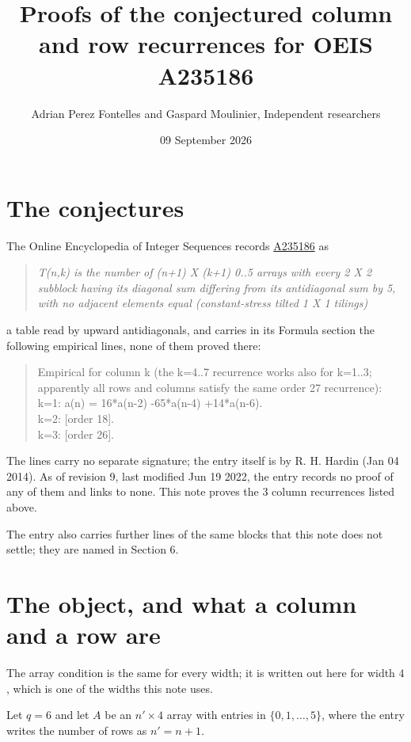 \documentclass[11pt]{article}
\title{Proofs of the conjectured column and row recurrences for OEIS A235186}
\author{Adrian Perez Fontelles and Gaspard Moulinier, Independent researchers}
\date{09 September 2026}
\theoremstyle{definition}
\begin{document}
\maketitle
\section{The conjectures}

The Online Encyclopedia of Integer Sequences records \href{https://oeis.org/A235186}{A235186} as

\begin{quote}\itshape T(n,k) is the number of (n+1) X (k+1) 0..5 arrays with every 2 X 2 subblock having its diagonal sum differing from its antidiagonal sum by 5, with no adjacent elements equal (constant-stress tilted 1 X 1 tilings)\end{quote}

a table read by upward antidiagonals, and carries in its Formula section the following empirical lines, none of them proved there:

\begin{quote}\ttfamily Empirical for column k (the k=4..7 recurrence works also for k=1..3; apparently all rows and columns satisfy the same order 27 recurrence):\\
k=1: a(n) = 16*a(n-2) -65*a(n-4) +14*a(n-6).\\k=2: [order 18].\\k=3: [order 26].\end{quote}

The lines carry no separate signature; the entry itself is by R. H. Hardin (Jan 04 2014). As of revision 9, last modified Jun 19 2022, the entry records no proof of any of them and links to none. This note proves the 3 column recurrences listed above.

The entry also carries further lines of the same blocks that this note does not settle; they are named in Section 6.

\section{The object, and what a column and a row are}

The array condition is the same for every width; it is written out here for width $4$, which is one of the widths this note uses.

Let $q = 6$ and let $A$ be an $n' \times 4$ array with entries in $\{0,1,\dots,5\}$, where the entry writes the number of rows as $n' = n + 1$.
\end{document}
